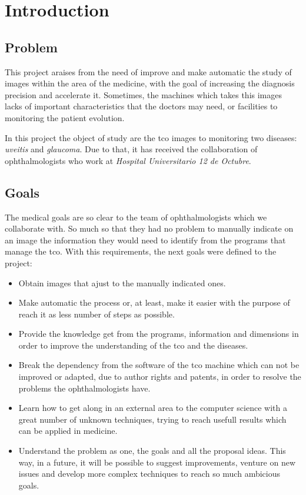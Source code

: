 \chapter{Introduction}
\section{Problem}
This project araises from the need of improve and make automatic the
study of images within the area of the medicine, with the goal of 
increasing the diagnosis precision and accelerate it. Sometimes, the
machines which takes this images lacks of important characteristics 
that the doctors may need, or facilities to monitoring the patient evolution.

In this project the object of study are the \gls{tco} images to monitoring
two diseases: \emph{\gls{uveitis}} and \emph{\gls{glaucoma}}. Due to that,
it has received the collaboration of ophthalmologists who work at
\emph{Hospital Universitario 12 de Octubre}.

\section{Goals}
The medical goals are so clear to the team of ophthalmologists which
we collaborate with. So much so that they had no problem to manually indicate on an 
image the information they would need to identify from the programs that 
manage the \gls{tco}. With this requirements, the next goals were defined 
to the project:
\begin{itemize}
\item Obtain images that ajust to the manually indicated ones.
\item Make automatic the process or, at least, make it easier with
the purpose of reach it as less number of steps as possible.
\item Provide the knowledge get from the programs, information and 
dimensions in order to improve the understanding of the \gls{tco} and
the diseases.
\item Break the dependency from the software of the \gls{tco} machine
which can not be improved or adapted, due to author rights and patents, 
in order to resolve the problems the ophthalmologists have.
\item Learn how to get along in an external area to the computer science
with a great number of unknown techniques, trying to reach usefull 
results which can be applied in medicine.
\item Understand the problem as one, the goals and all the proposal ideas.
This way, in a future, it will be possible to suggest improvements, venture
on new issues and develop more complex techniques to reach so much 
ambicious goals.
\end{itemize}

